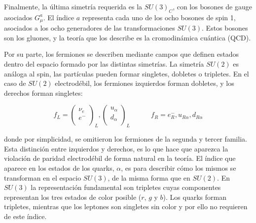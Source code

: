 Finalmente, la última simetría requerida es la $SU(3)_C$, con los bosones de gauge asociados $G_{\mu}^{a}$. El índice $a$ representa cada uno de los ocho bosones de spin 1, asociados a los ocho generadores de las transformaciones $SU(3)$. Estos bosones son los gluones, y la teoría que los describe es la cromodinámica cuántica (QCD).

Por su parte, los fermiones se describen mediante campos que definen estados dentro del espacio formado por las distintas simetrías. La simetría $SU(2)$ es análoga al spin, 
las partículas pueden formar singletes, dobletes o tripletes. %
En el caso de $SU(2)$ electrodébil, los fermiones izquierdos forman dobletes, y los derechos forman singletes:

\begin{equation}
	f_L = 
	\begin{pmatrix}
	\nu_{e} \\
	e^{-} \\
	\end{pmatrix}_{L},
	\begin{pmatrix}
	u_\alpha \\
	d_\alpha \\
	\end{pmatrix}_{L}
	\quad\quad\quad
	f_R = e^{-}_{R},u_{R\alpha},d_{R\alpha}
\end{equation}

\noindent
donde por simplicidad, se omitieron los fermiones de la segunda y tercer familia.
Esta distinción entre izquierdos y derechos, es lo que hace que aparezca la violación de paridad electrodébil de forma natural en la teoría. El índice que aparece en los estados de los quarks, $\alpha$, es para describir cómo los mismos se transforman en el espacio $SU(3)$, de la misma forma que en $SU(2)$. En $SU(3)$ la representación fundamental son tripletes cuyas componentes representan los tres estados de color posible ($r$, $g$ y $b$). Los quarks forman tripletes,  mientras que los leptones son singletes sin color y por ello no requieren de este índice.


